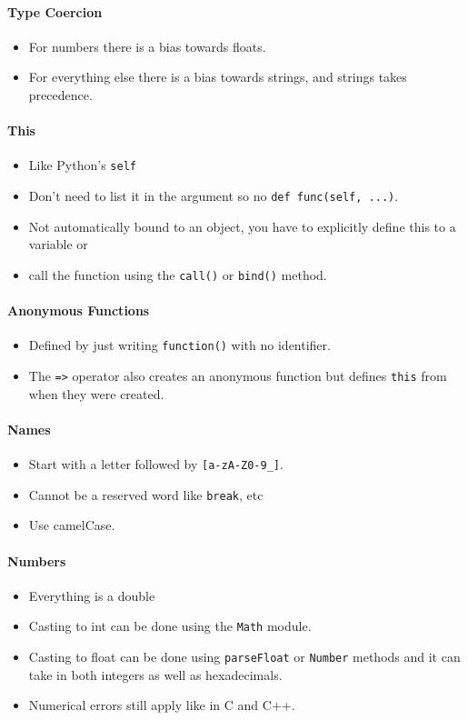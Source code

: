\documentclass[../CMPUT-404-Notes.tex]{subfiles}
\begin{document}
\paragraph{Type Coercion}
\begin{itemize}
  \item For numbers there is a bias towards floats.
  \item For everything else there is a bias towards strings, and strings takes precedence.
\end{itemize}
\paragraph{This}
\begin{itemize}
  \item Like Python's \texttt{self}
  \item Don't need to list it in the argument so no \texttt{def func(self, ...)}.
  \item Not automatically bound to an object, you have to explicitly define this to a variable or
  \item call the function using the \texttt{call()} or \texttt{bind()} method. 
\end{itemize}
\paragraph{Anonymous Functions}
\begin{itemize}
  \item Defined by just writing \texttt{function()} with no identifier.
  \item The \texttt{=>} operator also creates an anonymous function but defines \texttt{this} from when they were created.
\end{itemize}
\paragraph{Names}
\begin{itemize}
  \item Start with a letter followed by \texttt{[a-zA-Z0-9_]}.
  \item Cannot be a reserved word like \texttt{break}, etc
  \item Use camelCase.
\end{itemize}
\paragraph{Numbers}
\begin{itemize}
  \item Everything is a double
  \item Casting to int can be done using the \texttt{Math} module.
  \item Casting to float can be done using \texttt{parseFloat} or \texttt{Number} methods and it can take in both integers as well as hexadecimals. 
  \item Numerical errors still apply like in C and C++.
\end{itemize}
\end{document}
